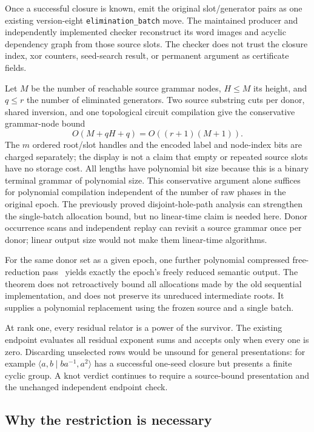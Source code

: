 Once a successful closure is known, emit the original slot/generator pairs
as one existing version-eight \texttt{elimination\_batch} move. The
maintained producer and independently implemented checker reconstruct its
word images and acyclic dependency graph from those source slots. The
checker does not trust the closure index, xor counters, seed-search result,
or permanent argument as certificate fields.

Let $M$ be the number of reachable source grammar nodes, $H\le M$ its
height, and $q\le r$ the number of eliminated generators. Two source
substring cuts per donor, shared inversion, and one topological circuit
compilation give the conservative grammar-node bound
\[
 O(M+qH+q)=O((r+1)(M+1)).
\]
The $m$ ordered root/slot handles and the encoded label and node-index
bits are charged separately; the display is not a claim that empty or
repeated source slots have no storage cost.
All lengths have polynomial bit size because this is a binary terminal
grammar of polynomial size. This conservative argument alone suffices for
polynomial compilation independent of the number of raw phases in the
original epoch. The previously proved disjoint-hole-path analysis can
strengthen the single-batch allocation bound, but no linear-time claim is
needed here. Donor occurrence scans and independent replay can revisit a
source grammar once per donor; linear output size would not make them
linear-time algorithms.

For the same donor set as a given epoch, one further polynomial compressed
free-reduction pass~\cite{schleimer} yields exactly the epoch's freely reduced semantic
output. The theorem does not retroactively bound all allocations made by
the old sequential implementation, and does not preserve its unreduced
intermediate roots. It supplies a polynomial replacement using the frozen
source and a single batch.

At rank one, every residual relator is a power of the survivor. The
existing endpoint evaluates all residual exponent sums and accepts only
when every one is zero. Discarding unselected rows would be unsound for
general presentations: for example $\langle a,b\mid ba^{-1},a^2\rangle$
has a successful one-seed closure but presents a finite cyclic group.
A knot verdict continues to require a source-bound presentation and the
unchanged independent endpoint check.

\subsection{Why the restriction is necessary}

